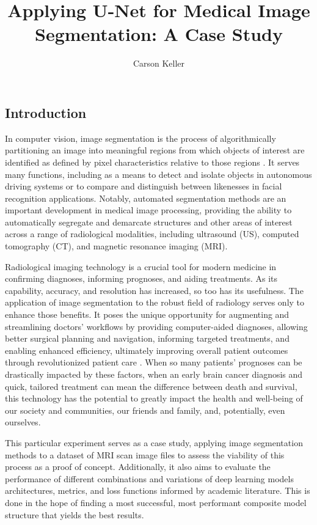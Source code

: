 \documentclass{article}
\title{\textbf{Applying U-Net for Medical Image Segmentation: A Case Study}}
\author{Carson Keller}
\affil{Department of Computer Science, Boise State University}
\date{}
\begin{document}
\maketitle

\begin{multicols}{2}

\section{Introduction}

In computer vision, image segmentation is the process of algorithmically partitioning an image into meaningful regions from which objects of interest are identified as defined by pixel characteristics relative to those regions \cite{palpal1993}. It serves many functions, including as a means to detect and isolate objects in autonomous driving systems or to compare and distinguish between likenesses in facial recognition applications. Notably, automated segmentation methods are an important development in medical image processing, providing the ability to automatically segregate and demarcate structures and other areas of interest across a range of radiological modalities, including ultrasound (US), computed tomography (CT), and magnetic resonance imaging (MRI).

Radiological imaging technology is a crucial tool for modern medicine in confirming diagnoses, informing prognoses, and aiding treatments. As its capability, accuracy, and resolution has increased, so too has its usefulness. The application of image segmentation to the robust field of radiology serves only to enhance those benefits. It poses the unique opportunity for augmenting and streamlining doctors’ workflows by providing computer-aided diagnoses, allowing better surgical planning and navigation, informing targeted treatments, and enabling enhanced efficiency, ultimately improving overall patient outcomes through revolutionized patient care \cite{realWorldApps}. When so many patients’ prognoses can be drastically impacted by these factors, when an early brain cancer diagnosis and quick, tailored treatment can mean the difference between death and survival, this technology has the potential to greatly impact the health and well-being of our society and communities, our friends and family, and, potentially, even ourselves.

This particular experiment serves as a case study, applying image segmentation methods to a dataset of MRI scan image files to assess the viability of this process as a proof of concept. Additionally, it also aims to evaluate the performance of different combinations and variations of deep learning models architectures, metrics, and loss functions informed by academic literature. This is done in the hope of finding a most successful, most performant composite model structure that yields the best results.


\end{multicols}
\end{document}
